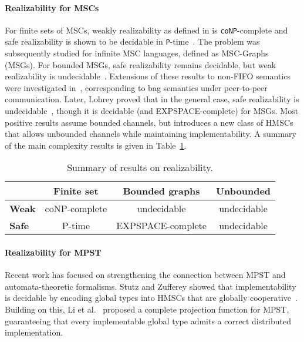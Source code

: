 
\paragraph{Realizability for MSCs}

For finite sets of MSCs, weakly realizability as defined in 
\cite{alur2005realizability}is \verb|coNP|-complete and safe 
realizability is shown to be decidable in \verb|P|-time~\cite{alur2005realizability}.
The problem was subsequently studied for infinite MSC languages, defined 
as MSC-Graphs (MSGs). For bounded MSGs, safe realizability 
remains decidable, but weak realizability 
is undecidable~\cite{alur2005realizability}. Extensions of these results to non-FIFO 
semantics were investigated in~\cite{morin2002recognizable}, corresponding 
to bag semantics under peer-to-peer communication. 
Later, Lohrey proved that in the general case, safe realizability 
is undecidable~\cite{lohrey2003realizability}, though it is decidable (and 
EXPSPACE-complete) for MSGs. %
Most positive results assume bounded channels, but \cite{bollig2025high} introduces 
a new class of HMSCs that allows unbounded channels while maintaining implementability.
A summary of the main complexity results is given in Table~\ref{tab:realizability}.

\begin{table}[!ht]
	\centering
	\begin{tabular}{|l|c|c|c|}
		\hline
		& \textbf{Finite set} & \textbf{Bounded graphs} & \textbf{Unbounded} \\
		\hline
		\textbf{Weak} & coNP-complete & undecidable & undecidable \\
		\hline
		\textbf{Safe} & P-time & EXPSPACE-complete & undecidable \\
		\hline
	\end{tabular}
	\caption{Summary of results on realizability.}
	\label{tab:realizability}
\end{table}

\paragraph{Realizability for MPST}

Recent work has focused on strengthening the connection between MPST 
and automata-theoretic formalisms. Stutz and Zufferey 
showed that implementability is decidable by encoding global types 
into HMSCs that are globally cooperative~\cite{stutz2022comparing,stutz2023asynchronous}. 
Building on this, Li et al.~\cite{li2023complete} proposed a complete 
projection function for MPST, guaranteeing that every implementable 
global type admits a correct distributed implementation.

